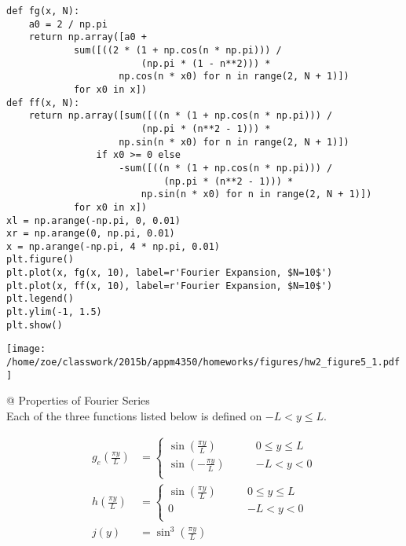 \documentclass[10pt]{article}
\begin{document}
\begin{easylist}[enumerate]
\weave

\begin{verbatim}
def fg(x, N):
    a0 = 2 / np.pi
    return np.array([a0 +
            sum([((2 * (1 + np.cos(n * np.pi))) /
                        (np.pi * (1 - n**2))) *
                    np.cos(n * x0) for n in range(2, N + 1)])
            for x0 in x])
def ff(x, N):
    return np.array([sum([((n * (1 + np.cos(n * np.pi))) /
                        (np.pi * (n**2 - 1))) *
                    np.sin(n * x0) for n in range(2, N + 1)])
                if x0 >= 0 else
                    -sum([((n * (1 + np.cos(n * np.pi))) /
                            (np.pi * (n**2 - 1))) *
                        np.sin(n * x0) for n in range(2, N + 1)])
            for x0 in x])
xl = np.arange(-np.pi, 0, 0.01)
xr = np.arange(0, np.pi, 0.01)
x = np.arange(-np.pi, 4 * np.pi, 0.01)
plt.figure()
plt.plot(x, fg(x, 10), label=r'Fourier Expansion, $N=10$')
plt.plot(x, ff(x, 10), label=r'Fourier Expansion, $N=10$')
plt.legend()
plt.ylim(-1, 1.5)
plt.show()
\end{verbatim}
\texttt{[image: /home/zoe/classwork/2015b/appm4350/homeworks/figures/hw2\_figure5\_1.pdf]}

\noweave

    \newpage
    @ Properties of Fourier Series\\

    Each of the three functions listed below is defined on $-L < y \le L$.

    \begin{align*}
        g_e \left( \frac{\pi y}{L} \right) &=
            \begin{cases}
                \sin \left( \frac{\pi y}{L} \right) \qquad & 0 \le y \le L\\
                \sin \left( -\frac{\pi y}{L} \right) \qquad & -L < y < 0\\
            \end{cases}\\
        h \left( \frac{\pi y}{L} \right) &=
            \begin{cases}
                \sin \left( \frac{\pi y}{L} \right) \qquad & 0 \le y \le L\\
                0 \qquad & -L < y < 0\\
            \end{cases}\\
        j(y) &= \sin^3 \left( \frac{\pi y}{L} \right)
    \end{align*}


\end{easylist}
\end{document}
